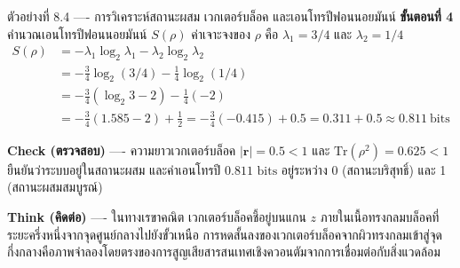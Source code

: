 \begin{psctbox}{ตัวอย่างที่ 8.4 ---- การวิเคราะห์สถานะผสม เวกเตอร์บล็อค และเอนโทรปีฟอนนอยมันน์}
\textbf{ขั้นตอนที่ 4} คำนวณเอนโทรปีฟอนนอยมันน์ $S(\rho)$
ค่าเจาะจงของ $\rho$ คือ $\lambda_1 = 3/4$ และ $\lambda_2 = 1/4$
\begin{align*}
S(\rho) &= -\lambda_1 \log_2 \lambda_1 - \lambda_2 \log_2 \lambda_2 \\
&= -\frac{3}{4}\log_2(3/4) - \frac{1}{4}\log_2(1/4) \\
&= -\frac{3}{4}(\log_2 3 - 2) - \frac{1}{4}(-2) \\
&= -\frac{3}{4}(1.585 - 2) + \frac{1}{2} = -\frac{3}{4}(-0.415) + 0.5 = 0.311 + 0.5 \approx 0.811~\text{bits}
\end{align*}

\textbf{Check (ตรวจสอบ)} ---- ความยาวเวกเตอร์บล็อค $|\mathbf{r}| = 0.5 < 1$ และ $\text{Tr}(\rho^2) = 0.625 < 1$ ยืนยันว่าระบบอยู่ในสถานะผสม และค่าเอนโทรปี $0.811\text{ bits}$ อยู่ระหว่าง 0 (สถานะบริสุทธิ์) และ 1 (สถานะผสมสมบูรณ์)

\textbf{Think (คิดต่อ)} ---- ในทางเรขาคณิต เวกเตอร์บล็อคชี้อยู่บนแกน $z$ ภายในเนื้อทรงกลมบล็อคที่ระยะครึ่งหนึ่งจากจุดศูนย์กลางไปยังขั้วเหนือ การหดสั้นลงของเวกเตอร์บล็อคจากผิวทรงกลมเข้าสู่จุดกึ่งกลางคือภาพจำลองโดยตรงของการสูญเสียสารสนเทศเชิงควอนตัมจากการเชื่อมต่อกับสิ่งแวดล้อม
\end{psctbox}

